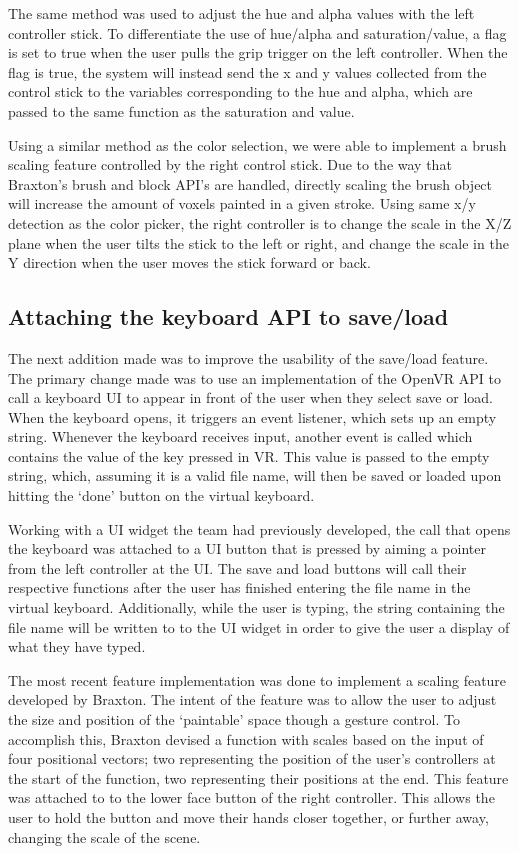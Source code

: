 \documentclass[onecolumn, draftclsnofoot,10pt, compsoc]{IEEEtran}
\begin{document}
The same method was used to adjust the hue and alpha values with the left controller stick. To differentiate the use of hue/alpha and saturation/value, a flag is set to true when the user pulls the grip trigger on the left controller. When the flag is true, the system will instead send the x and y values collected from the control stick to the variables corresponding to the hue and alpha, which are passed to the same function as the saturation and value.

Using a similar method as the color selection, we were able to implement a brush scaling feature controlled by the right control stick. Due to the way that Braxton’s brush and block API’s are handled, directly scaling the brush object will increase the amount of voxels painted in a given stroke. Using same x/y detection as the color picker, the right controller is to change the scale in the X/Z plane when the user tilts the stick to the left or right, and change the scale in the Y direction when the user moves the stick forward or back.

\subsection{Attaching the keyboard API to save/load }

The next addition made was to improve the usability of the save/load feature. The primary change made was to use an implementation of the OpenVR API to call a keyboard UI to appear in front of the user when they select save or load. When the keyboard opens, it triggers an event listener, which sets up an empty string. Whenever the keyboard receives input, another event is called which contains the value of the key pressed in VR. This value is passed to the empty string, which, assuming it is a valid file name, will then be saved or loaded upon hitting the ‘done’ button on the virtual keyboard.

Working with a UI widget the team had previously developed, the call that opens the keyboard was attached to a UI button that is pressed by aiming a pointer from the left controller at the UI. The save and load buttons will call their respective functions after the user has finished entering the file name in the virtual keyboard. Additionally, while the user is typing, the string containing the file name will be written to to the UI widget in order to give the user a display of what they have typed.

The most recent feature implementation was done to implement a scaling feature developed by Braxton. The intent of the feature was to allow the user to adjust the size and position of the ‘paintable’ space though a gesture control. To accomplish this, Braxton devised a function with scales based on the input of four positional vectors; two representing the position of the user’s controllers at the start of the function, two representing their positions at the end. This feature was attached to to the lower face button of the right controller. This allows the user to hold the button and move their hands closer together, or further away, changing the scale of the scene.
\end{document}
